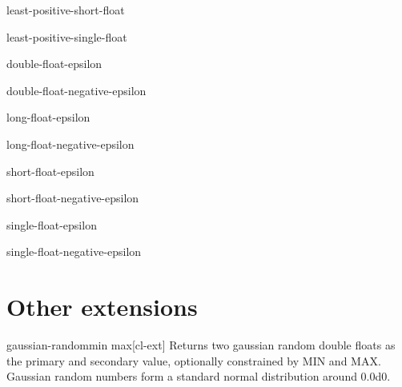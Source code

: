 \documentclass[10pt,english]{book}
\begin{document}
\begin{constant}{least-positive-short-float}{}
  
\end{constant}

\begin{constant}{least-positive-single-float}{}
  
\end{constant}

\begin{constant}{double-float-epsilon}{}
  
\end{constant}

\begin{constant}{double-float-negative-epsilon}{}
  
\end{constant}

\begin{constant}{long-float-epsilon}{}
  
\end{constant}

\begin{constant}{long-float-negative-epsilon}{}
  
\end{constant}

\begin{constant}{short-float-epsilon}{}
  
\end{constant}

\begin{constant}{short-float-negative-epsilon}{}
  
\end{constant}

\begin{constant}{single-float-epsilon}{}
  
\end{constant}

\begin{constant}{single-float-negative-epsilon}{}
  
\end{constant}

\section{Other extensions}
\label{sec:other-extensions}

\begin{function}{gaussian-random}{\op min max}[cl-ext]
  Returns two gaussian random double floats as the primary and secondary value,
optionally constrained by MIN and MAX. Gaussian random numbers form a standard
normal distribution around 0.0d0.
\end{function}
\end{document}
